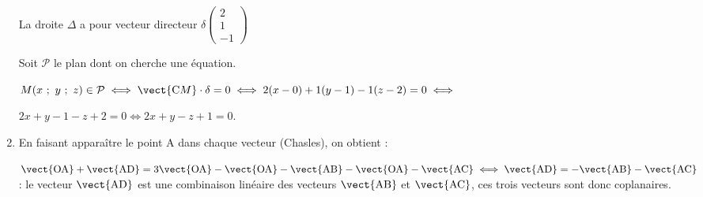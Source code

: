 \begin{enumerate}
La droite $\Delta$ a pour vecteur directeur $\delta\begin{pmatrix}2\\1\\-1\end{pmatrix}$

Soit $\mathcal{P}$ le plan dont on cherche une équation.

$M(x~;~y~;~z) \in \mathcal{P} \iff \vect{\text{C}M} \cdot \delta = 0 \iff 2(x - 0) + 1(y - 1) -1(z - 2) = 0 \iff$

$ 2x + y - 1 - z + 2 = 0 \iff 2x + y - z + 1 = 0$.
\item %

En faisant apparaître le point A dans chaque vecteur (Chasles), on obtient :

$\vect{\text{OA}} + \vect{\text{AD}}  = 3\vect{\text{OA}}  - \vect{\text{OA}}  - \vect{\text{AB}}  - \vect{\text{OA}}  - \vect{\text{AC}} \iff \vect{\text{AD}}  = - \vect{\text{AB}} - \vect{\text{AC}} $ : le vecteur $\vect{\text{AD}}$ est une combinaison linéaire des vecteurs $\vect{\text{AB}}$ et $\vect{\text{AC}}$, ces trois vecteurs sont donc coplanaires.
\end{enumerate}

\bigskip

